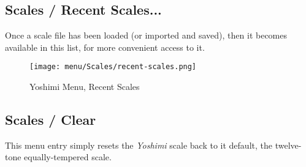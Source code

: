 \subsection{Scales / Recent Scales...}
\label{subsec:scales_recent_scales}

   Once a scale file has been loaded (or imported and saved), then it
   becomes available in this list, for more convenient access to it.

\begin{figure}[H]
   \centering
   \texttt{[image: menu/Scales/recent-scales.png]}
   \caption{Yoshimi Menu, Recent Scales}
   \label{fig:yoshimi_recent_scales}
\end{figure}

\subsection{Scales / Clear}
\label{subsec:scales_clear}

   This menu entry simply resets the \textsl{Yoshimi} scale back to it default,
   the twelve-tone equally-tempered scale.

